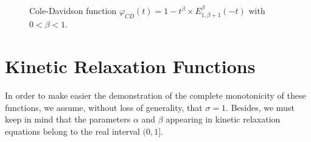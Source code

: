 \documentclass[12pt]{amsart}
\numberwithin{equation}{section}
\begin{document}
\begin{figure}[H]
\center
{}
\qquad
{}
\caption{Cole-Davidson function $\varphi_{CD}(t)=1-t^{\beta}\times E_{1,\beta+1}^{\beta}(-t)$ with $0<\beta<1$.}
\label{daavi}
\end{figure}


\section{Kinetic Relaxation Functions}

In order to make easier the demonstration of the complete monotonicity of
these functions, we assume, without loss of generality, that $\sigma =1$.
Besides, we must keep in mind that the parameters $\alpha$ and $\beta$
appearing in kinetic relaxation equations belong to the real interval
$(0,1]$. 
\end{document}
